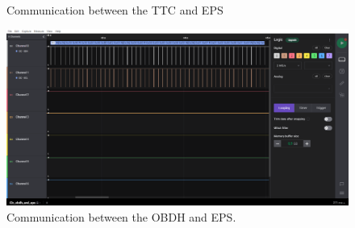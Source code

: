 \begin{figure}[!htb]
    \begin{center}
        ~
        \caption{Communication between the TTC and EPS}
        \label{fig:test-uart}
    \end{center}
\end{figure}

\begin{figure}[!ht]
    \begin{center}
        \includegraphics[width=\columnwidth]{figures/eps_i2c_protocol_experiment.png}
        \caption{Communication between the OBDH and EPS.}
        \label{fig:test-i2c}
    \end{center}
\end{figure}

